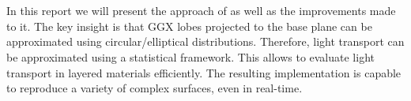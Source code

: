 \section*{}
\label{sec:abstract}

In this report we will present the approach of \textcite{belcour2018} as well as the improvements \textcite{weier2020,yamaguchi2019} made to it. The key insight is that GGX lobes projected to the base plane can be approximated using circular/elliptical distributions. Therefore, light transport can be approximated using a statistical framework. This allows to evaluate light transport in layered materials efficiently. The resulting implementation is capable to reproduce a variety of complex surfaces, even in real-time.